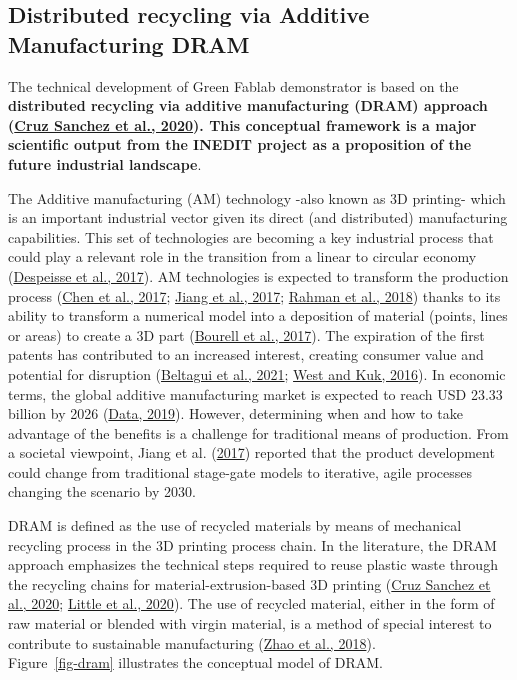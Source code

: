 \documentclass[
  11pt,
]{article}
\begin{document}
\hypertarget{distributed-recycling-via-additive-manufacturing-dram}{%
\subsection{Distributed recycling via Additive Manufacturing
DRAM}\label{distributed-recycling-via-additive-manufacturing-dram}}

The technical development of Green Fablab demonstrator is based on the
\textbf{distributed recycling via additive manufacturing (DRAM) approach
(\protect\hyperlink{ref-CruzSanchez2020}{Cruz Sanchez et al., 2020}).
This conceptual framework is a major scientific output from the INEDIT
project as a proposition of the future industrial landscape}.

The Additive manufacturing (AM) technology -also known as 3D printing-
which is an important industrial vector given its direct (and
distributed) manufacturing capabilities. This set of technologies are
becoming a key industrial process that could play a relevant role in the
transition from a linear to circular economy
(\protect\hyperlink{ref-Despeisse2016}{Despeisse et al., 2017}). AM
technologies is expected to transform the production process
(\protect\hyperlink{ref-Chen2017}{Chen et al., 2017};
\protect\hyperlink{ref-Jiang2017}{Jiang et al., 2017};
\protect\hyperlink{ref-Rahman2018}{Rahman et al., 2018}) thanks to its
ability to transform a numerical model into a deposition of material
(points, lines or areas) to create a 3D part
(\protect\hyperlink{ref-Bourell2017}{Bourell et al., 2017}). The
expiration of the first patents has contributed to an increased
interest, creating consumer value and potential for disruption
(\protect\hyperlink{ref-Beltagui2020}{Beltagui et al., 2021};
\protect\hyperlink{ref-West2016a}{West and Kuk, 2016}). In economic
terms, the global additive manufacturing market is expected to reach USD
23.33 billion by 2026 (\protect\hyperlink{ref-ReportsAndData2019}{Data,
2019}). However, determining when and how to take advantage of the
benefits is a challenge for traditional means of production. From a
societal viewpoint, Jiang et al.
(\protect\hyperlink{ref-Jiang2017}{2017}) reported that the product
development could change from traditional stage-gate models to
iterative, agile processes changing the scenario by 2030.

DRAM is defined as the use of recycled materials by means of mechanical
recycling process in the 3D printing process chain. In the literature,
the DRAM approach emphasizes the technical steps required to reuse
plastic waste through the recycling chains for material-extrusion-based
3D printing (\protect\hyperlink{ref-CruzSanchez2020}{Cruz Sanchez et
al., 2020}; \protect\hyperlink{ref-Little2020}{Little et al., 2020}).
The use of recycled material, either in the form of raw material or
blended with virgin material, is a method of special interest to
contribute to sustainable manufacturing
(\protect\hyperlink{ref-Zhao2018}{Zhao et al., 2018}).\\
Figure~\ref{fig-dram} illustrates the conceptual model of DRAM.
\end{document}
